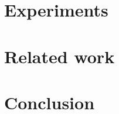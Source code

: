 \documentclass[acmsmall,review,anonymous]{acmart}\settopmatter{printfolios=true,printccs=false,printacmref=false}
\begin{document}
\section{Experiments}
\label{sec:experiments}


\section{Related work}
\label{sec:related}


\section{Conclusion}
\label{sec:conclusion}



\end{document}

